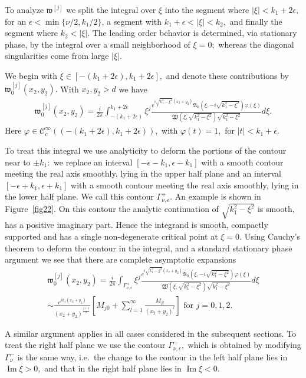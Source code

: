 \documentclass[11pt]{article}
\newcommand\fw{\mathfrak w}
\newcommand\fW{\mathfrak W}
\newcommand\fA{\mathfrak A}
\newcommand\cC{\mathcal{C}}
\renewcommand\Im{\operatorname{Im}}
\theoremstyle{definition}
\theoremstyle{remark}
\begin{document}
To analyze $\fw^{[j]}$ we split the integral over $\xi$ into the segment where
$|\xi|<k_1+2\epsilon,$ for an $\epsilon<\min\{\nu/2,k_1/2\}$, a segment with
$k_1+\epsilon<|\xi|<k_2,$ and finally the segment where $k_2<|\xi|.$ The leading
order behavior is determined, via stationary phase, by the integral over
a small neighborhood of $\xi=0;$ whereas the diagonal singularities come from
large $|\xi|.$

We begin with $\xi\in [-(k_1+2\epsilon),k_1+2\epsilon],$ and
denote these contributions by $\fw^{[j]}_0(x_2,y_2).$ With $x_2,y_2>d$ we have
\begin{multline}\label{eqn98.20}
  \fw^{[j]}_{0}(x_2,y_2)
  =\frac{i}{2\pi}\int_{-(k_1+2\epsilon)}^{k_1+2\epsilon}\xi^j\frac{e^{i\sqrt{k_1^2-\xi^2}(x_2+y_2)}\fA_0(\xi,-i\sqrt{k_1^2-\xi^2})
  \varphi(\xi)}
  {\fW(\xi,\sqrt{k_1^2-\xi^2})\sqrt{k_1^2-\xi^2}}d\xi.
\end{multline}
Here $\varphi\in\cC^{\infty}_{c}((-(k_1+2\epsilon),k_1+2\epsilon)),$ with
$\varphi(t)=1,$ for $|t|<k_1+\epsilon.$

To treat this integral we use analyticity to deform the portions of the contour
near to $\pm k_1:$ we replace an interval $[-\epsilon-k_1,\epsilon-k_1]$ with a
smooth contour meeting the real axis smoothly, lying in the upper half plane and
an interval $[-\epsilon+k_1,\epsilon+k_1]$ with a smooth contour meeting the
real axis smoothly, lying in the lower half plane. We call this contour
$\Gamma^+_{\nu,\epsilon}.$ An example is shown in Figure~\ref{fig22}. On this
contour the analytic continuation of $\sqrt{k_1^2-\xi^2}$ is smooth, has a
positive imaginary part. Hence the integrand is smooth, compactly supported and
has a single non-degenerate critical point at $\xi=0.$ Using Cauchy's theorem to
deform the contour in the integral, and a standard stationary phase argument we
see that there are complete asymptotic expansions
\begin{multline}\label{eqn58.55}
 \fw^{[j]}_{0}(x_2,y_2)= \frac{i}{2\pi}\int_{\Gamma_{\nu,\epsilon}^+}\xi^j\frac{e^{i\sqrt{k_1^2-\xi^2}(x_2+y_2)}\fA_0(\xi,-i\sqrt{k_1^2-\xi^2})\varphi(\xi)}
       {\fW(\xi,\sqrt{k_1^2-\xi^2})\sqrt{k_1^2-\xi^2}}d\xi\\ \sim
      \frac{e^{ik_1(x_2+y_2)}}{(x_2+y_2)^{\frac{j+1}{2}}}\left[M_{j0}+\sum_{l=1}^{\infty}\frac{M_{jl}}{(x_2+y_2)^l}\right]
      \text{  for }j=0,1,2.
\end{multline}

A similar argument applies in all cases considered in the subsequent
sections. To treat the right half plane we use the contour
$\Gamma^-_{\nu,\epsilon},$ which is obtained by modifying $\Gamma^-_{\nu}$ is
the same way, i.e.~the change to the contour in the left half plane lies in
$\Im\xi>0,$ and that in the right half plane lies in $\Im\xi <0.$ 
\end{document}
